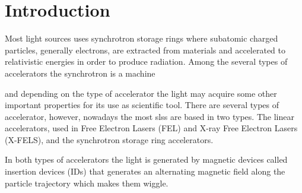 




% 


	\frenchspacing

	\pretextual
	

	\textual

\chapter{Introduction} \label{chap:intro}

	Most light sources uses synchrotron storage rings where subatomic charged particles, generally electrons, are extracted from materials and accelerated to relativistic energies in order to produce radiation. Among the several types of accelerators the synchrotron is a machine


	and depending on the type of accelerator the light may acquire some other important properties for its use as scientific tool. There are several types of accelerator, however, nowadays the most  \gls{sls}s are based in two types. The linear accelerators, used in Free Electron Lasers (FEL) and X-ray Free Electron Lasers (X-FELS), and the synchrotron storage ring accelerators.

	In both types of accelerators the light is generated by magnetic devices called insertion devices (IDs) that generates an alternating magnetic field along the particle trajectory which makes them wiggle.


